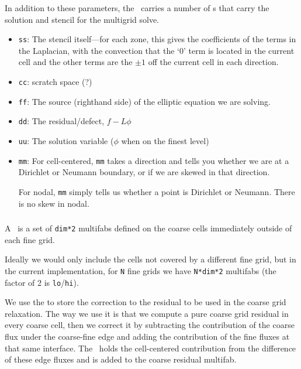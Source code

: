 In addition to these parameters, the \mgtower\ carries a number of
\multifab s that carry the solution and stencil for the multigrid
solve.

\begin{itemize}

\item {\tt ss}: The stencil itself---for each zone, this gives the 
  coefficients of the terms in the Laplacian, with the convection that
  the `0' term is located in the current cell and the other terms are
  the $\pm 1$ off the current cell in each direction.

\item {\tt cc}: scratch space (?)

\item {\tt ff}: The source (righthand side) of the elliptic equation
  we are solving.

\item {\tt dd}: The residual/defect, $f - L\phi$

\item {\tt uu}: The solution variable ($\phi$ when on the finest level)

\item {\tt mm}: For cell-centered, {\tt mm} takes a direction and
   tells you whether we are at a Dirichlet or Neumann boundary, or if 
   we are skewed in that direction.

   For nodal, {\tt mm} simply tells us whether a point is Dirichlet
   or Neumann.  There is no skew in nodal.

\end{itemize}


\subsubsection{\bndryreg}

A \bndryreg\ is a set of {\tt dim*2} multifabs defined on the coarse cells
immediately outside of each fine grid.

Ideally we would only include the cells not covered by a different
fine grid, but in the current implementation, for {\tt N} fine grids we have
{\tt N*dim*2} multifabs (the factor of 2 is {\tt lo}/{\tt hi}).

We use the \bndryreg to store the correction to the residual to be
used in the coarse grid relaxation.  The way we use it is that we
compute a pure coarse grid residual in every coarse cell, then we
correct it by subtracting the contribution of the coarse flux under
the coarse-fine edge and adding the contribution of the fine fluxes at
that same interface.  The \bndryreg\ holds the cell-centered
contribution from the difference of these edge fluxes and is added to
the coarse residual multifab.


